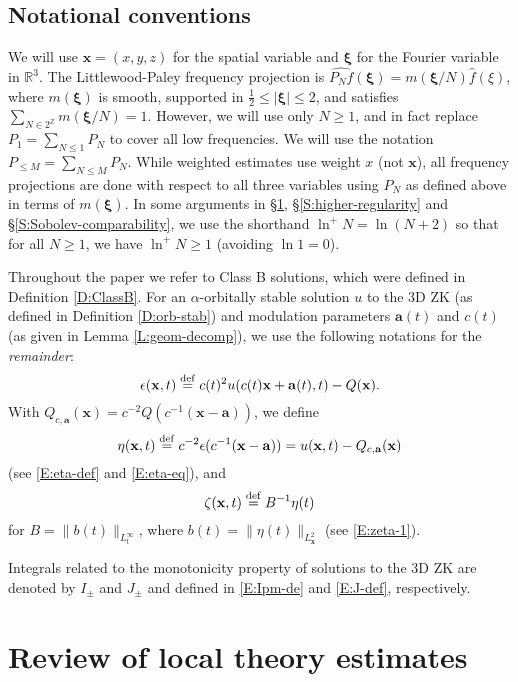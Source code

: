 \documentclass[12pt,letterpaper]{amsart}
\newcommand{\defeq}{\stackrel{\rm{def}}{=}}
\theoremstyle{remark}
\numberwithin{equation}{section}
\numberwithin{theorem}{section}
\numberwithin{table}{section}
\begin{document}
\subsection{Notational conventions}
We will use $\mathbf{x} = (x,y,z)$ for the spatial variable and $\boldsymbol{\xi}$ for the Fourier variable in $\mathbb{R}^3$.  The Littlewood-Paley frequency projection is $\widehat{P_N f}(\boldsymbol{\xi}) = m(\boldsymbol{\xi}/N) \hat f(\xi)$, where $m(\boldsymbol{\xi})$ is smooth, supported in $\frac12\leq |\boldsymbol{\xi}| \leq 2$, and satisfies $\sum_{N \in 2^{\mathbb{Z}}} m(\boldsymbol{\xi}/N) = 1$.  However, we will use only $N \geq 1$, and in fact replace $P_1 = \sum_{N\leq 1} P_N$ to cover all low frequencies.  We will use the notation $P_{\leq M} = \sum_{N\leq M} P_N$.   While weighted estimates use weight $x$ (not $\mathbf{x}$), all frequency projections are done with respect to all three variables using $P_N$ as defined above in terms of $m(\boldsymbol{\xi})$.  In some arguments in \S\ref{S:RV-estimates}, \S\ref{S:higher-regularity} and \S\ref{S:Sobolev-comparability}, we use the shorthand $\ln^+N = \ln(N+2)$ so that for all $N \geq 1$, we have $\ln^+N \geq 1$ (avoiding $\ln 1=0$).

Throughout the paper we refer to Class B solutions, which were defined in Definition \ref{D:ClassB}.  
For an $\alpha$-orbitally stable solution $u$ to the 3D ZK (as defined in Definition \ref{D:orb-stab}) and modulation parameters $\mathbf{a}(t)$ and $c(t)$ (as given in Lemma \ref{L:geom-decomp}), we use the following notations for the \emph{remainder}:
$$
\epsilon(\mathbf{x},t) \defeq c(t)^2u(c(t)\mathbf{x}+\mathbf{a}(t),t) - Q(\mathbf{x}).
$$
With $Q_{c,\mathbf{a}}(\mathbf{x}) = c^{-2} Q(c^{-1}(\mathbf{x}-\mathbf{a}))$, we define
$$
\eta(\mathbf{x},t) \defeq c^{-2}\epsilon(c^{-1}(\mathbf{x}-\mathbf{a})) = u(\mathbf{x},t) - Q_{c, \mathbf{a}}(\mathbf{x})
$$
(see \eqref{E:eta-def} and \eqref{E:eta-eq}), and 
$$
\zeta(\mathbf{x},t) \defeq B^{-1} \eta(t)
$$
for $B = \|b(t) \|_{L_t^\infty}$, where $b(t) = \|\eta(t) \|_{L_{\mathbf{x}}^2}$  (see \eqref{E:zeta-1}).

Integrals related to the monotonicity property of solutions to the 3D ZK are denoted by $I_\pm$ and $J_\pm$ and defined in \eqref{E:Ipm-de} and \eqref{E:J-def}, respectively.



\section{Review of local theory estimates}
\label{S:RV-estimates}
\end{document}

